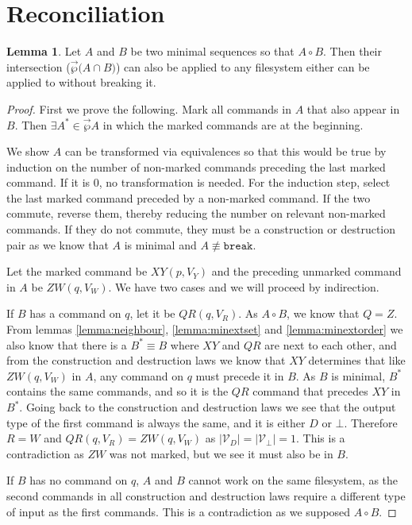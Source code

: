 \documentclass[12pt]{article}
\newcommand{\setvx}[1]{\mathcal{V}_{#1}}
\newcommand{\setd}{\setvx{D}}
\newcommand{\setb}{\setvx{\empt}}
\newcommand{\empt}{\bot}
\newcommand{\cbrk}{\mathtt{break}}
\newcommand{\fscommand}[2]{{#1#2}}
\newcommand{\cxy}{\fscommand{X}{Y}}
\newcommand{\czw}{\fscommand{Z}{W}}
\newcommand{\cqr}{\fscommand{Q}{R}}
\newcommand{\nequiv}{\not\equiv}
\newcommand{\coworks}{\circ}
\newcommand{\orderset}[1]{\vec{\wp}{#1}}
\theoremstyle{definition}
\newtheorem{mylem}{Lemma}
\begin{document}
\section{Reconciliation}



\begin{mylem}
Let $A$ and $B$ be two minimal sequences so that $A\coworks B$.
Then their intersection ($\orderset(A\cap B)$) can also be applied to any filesystem
either can be applied to without breaking it.
\end{mylem}

\begin{proof}
First we prove the following.
Mark all commands in $A$ that also appear in $B$.
Then $\exists A^* \in \orderset{A}$ in which the marked commands are at the beginning.

\medskip

We show $A$ can be transformed via equivalences so that this would be true
by induction on the number of non-marked commands preceding the last marked command.
If it is 0, no transformation is needed.
For the induction step, select the last marked command preceded by a non-marked command.
If the two commute, reverse them, thereby reducing the number on relevant non-marked commands.
If they do not commute, they must be a construction or destruction pair as we know
that $A$ is minimal and $A\nequiv\cbrk$.

Let the marked command be $\cxy(p, V_Y)$ and the preceding unmarked command in $A$ be $\czw(q, V_W)$.
We have two cases and we will proceed by indirection.

If $B$ has a command on $q$, let it be $\cqr(q, V_R)$. As $A\coworks B$, we know
that $Q=Z$. From lemmas \ref{lemma:neighbour}, \ref{lemma:minextset} and \ref{lemma:minextorder}
we also know that there is a $B^*\equiv B$ where $\cxy$ and $\cqr$ are next to each other,
and from the construction and destruction laws we know that $\cxy$ determines that like
$\czw(q, V_W)$ in $A$, any command on $q$ must precede it in $B$. As $B$ is minimal, $B^*$
contains the same commands, and so it is the $\cqr$ command that precedes $\cxy$ in $B^*$.
Going back to the construction and destruction laws we see that the output type of the first command
is always the same, and it is either $D$ or $\empt$. Therefore $R=W$ and $\cqr(q, V_R)=\czw(q, V_W)$
as $|\setd|=|\setb|=1$. This is a contradiction as $\czw$ was not marked, but we see it must also be in $B$.

If $B$ has no command on $q$, $A$ and $B$ cannot work on the same filesystem,
as the second commands in all construction and destruction laws require a different type of input
as the first commands. This is a contradiction as we supposed $A\coworks B$.


\end{proof}
\end{document}
